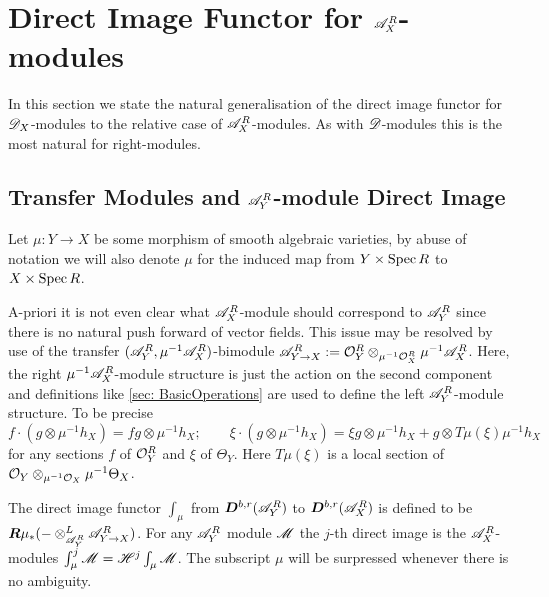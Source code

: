 \section{Direct Image Functor for $\mathscr{A}_X^R$-modules}
    In this section we state the natural generalisation of the direct image functor for $\mathscr{D}_X$-modules to the relative case of $\mathscr{A}_X^R$-modules. As with $\mathscr{D}$-modules this is the most natural for right-modules.

    \subsection{Transfer Modules and $\mathscr{A}_Y^R$-module Direct Image}
    Let $\mu:Y\to X$ be some morphism of smooth algebraic varieties, by abuse of notation we will also denote $\mu$ for the induced map from $Y\times \operatorname{Spec} R$ to $X\times \operatorname{Spec} R$.

    A-priori it is not even clear what $\mathscr{A}_X^R$-module should correspond to $\mathscr{A}_Y^R$ since there is no natural push forward of vector fields.
    This issue may be resolved by use of the transfer $(\mathscr{A}_Y^R,\mu^{-1}\mathscr{A}_X^R)$-bimodule $\mathscr{A}_{Y\to X}^R:= \mathcal{O}_Y^R \otimes_{\mu^{-1}\mathcal{O}_X^R}\mu^{-1}\mathscr{A}_X^R$.
    Here, the right $\mu^{-1}\mathscr{A}_X^R$-module structure is just the action on the second component and definitions like \cref{sec: BasicOperations} are used to define the left $\mathscr{A}_Y^R$-module structure. To be precise
    $$f\cdot (g\otimes \mu^{-1}h_X) = fg \otimes \mu^{-1}h_X; \qquad \xi\cdot (g\otimes\mu^{-1}h_X) = \xi g \otimes \mu^{-1}h_X + g \otimes T\mu(\xi)\mu^{-1}h_X $$
    for any sections $f$ of $\mathcal{O}_Y^R$ and $\xi$ of $\Theta_Y$. Here $T\mu(\xi)$ is a local section of $\mathcal{O}_Y\otimes_{\mu^{-1}\mathcal{O}_X} \mu^{-1}\Theta_X$.
    \begin{definition}
      The direct image functor $\int_\mu$ from $\boldsymbol{D}^{b,r}(\mathscr{A}_Y^R)$ to $\boldsymbol{D}^{b,r}(\mathscr{A}_X^R)$ is defined to be $\boldsymbol{R}\mu_* ({-}\otimes_{\mathscr{A}_Y^R}^L \mathscr{A}_{Y\to X}^R)$.
      For any $\mathscr{A}_Y^R$ module $\mathscr{M}$ the $j$-th direct image is the $\mathscr{A}_X^R$-modules $\int_\mu^j \mathscr{M} = \mathscr{H}^j \int_\mu \mathscr{M}$.
      The subscript $\mu$ will be surpressed whenever there is no ambiguity.
    \end{definition}

